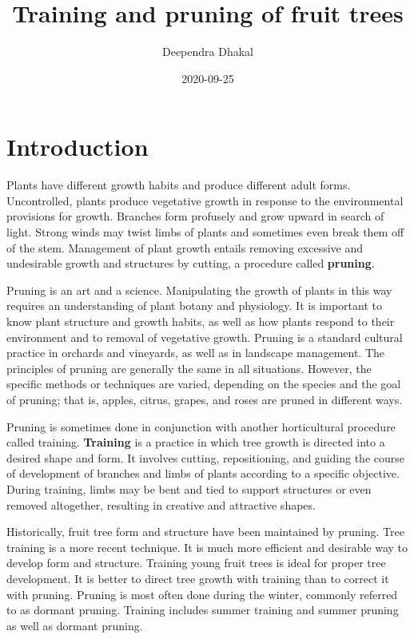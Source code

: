 \documentclass[
]{article}
\title{Training and pruning of fruit trees}
\author{Deependra Dhakal}
\date{2020-09-25}
\begin{document}
\maketitle

{
\setcounter{tocdepth}{3}
\tableofcontents
}
\hypertarget{introduction}{%
\section*{Introduction}\label{introduction}}

Plants have different growth habits and produce different adult forms. Uncontrolled, plants produce vegetative growth in response to the environmental provisions for growth. Branches form profusely and grow upward in search of light. Strong winds may twist limbs of plants and sometimes even break them off of the stem.
Management of plant growth entails removing excessive and undesirable growth and structures by cutting, a procedure called \textbf{pruning}.

Pruning is an art and a science. Manipulating the growth of plants in this way requires an understanding of plant botany and physiology. It is important to know plant structure and growth habits, as well as how plants respond to their environment and to removal of vegetative growth. Pruning is a standard cultural practice in orchards and vineyards, as well as in landscape management. The principles of pruning are generally the same in all situations. However, the specific methods or techniques are varied, depending on the species and the goal of pruning; that is, apples, citrus, grapes, and roses are pruned in different ways.

Pruning is sometimes done in conjunction with another horticultural procedure called training. \textbf{Training} is a practice in which tree growth is directed into a desired shape and form. It involves cutting, repositioning, and guiding the course of development of branches and limbs of plants according to a specific objective. During training, limbs may be bent and tied to support structures or even removed altogether, resulting in creative and attractive shapes.

Historically, fruit tree form and structure have been maintained by pruning. Tree training is a more recent technique. It is much more efficient and desirable way to develop form and structure. Training young fruit trees is ideal for proper tree development. It is better to direct tree growth with training than to correct it with pruning. Pruning is most often done during the winter, commonly referred to as dormant pruning. Training includes summer training and summer pruning as well as dormant pruning.
\end{document}
